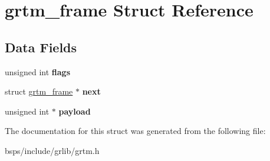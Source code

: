 \hypertarget{structgrtm__frame}{}\section{grtm\+\_\+frame Struct Reference}
\label{structgrtm__frame}
\subsection*{Data Fields}
\begin{DoxyCompactItemize}
\item 
\mbox{\label{structgrtm__frame_a82a6db59f13abf34d10679e05f327cdb}} 
unsigned int {\bfseries flags}
\item 
\mbox{\label{structgrtm__frame_a69b95ddc056095a44321fa8e59b38adc}} 
struct \mbox{\hyperlink{structgrtm__frame}{grtm\+\_\+frame}} $\ast$ {\bfseries next}
\item 
\mbox{\label{structgrtm__frame_a1b28004cdb7f7781d19cbf527217ae79}} 
unsigned int $\ast$ {\bfseries payload}
\end{DoxyCompactItemize}


The documentation for this struct was generated from the following file\+:\begin{DoxyCompactItemize}
\item 
bsps/include/grlib/grtm.\+h\end{DoxyCompactItemize}
